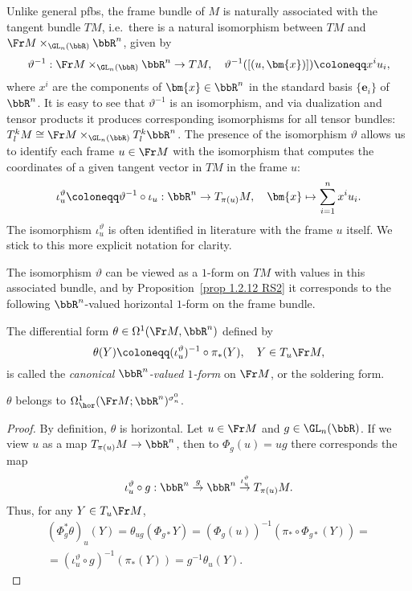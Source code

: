 Unlike general \glspl{pfb}, the frame bundle of $M$ is naturally associated with the tangent bundle $TM$, i.e.\ there is a natural isomorphism between $TM$ and  $\Fr M\times_{\GL_n(\bbR)}\bbR^n$, given by
\[\vartheta^{-1}:\Fr M \times_{\GL_n(\bbR)} \bbR^n\to TM,\quad \vartheta^{-1}([(u,\bm{x})])\coloneqq x^iu_i,\label{eq 2.1.2 RS2}\]
where $x^i$ are the components of $\bm{x}\in\bbR^n$ in the standard basis $\{\bm{e}_i\}$ of $\bbR^n$. It is easy to see that $\vartheta^{-1}$ is an isomorphism, and via dualization and tensor products it produces corresponding isomorphisms for all tensor bundles: $T^k_l M\cong \Fr M\times_{\GL_n(\bbR)}T^k_l\bbR^n$. The presence of the isomorphism $\vartheta$ allows us to identify each frame $u\in \Fr M$ with the isomorphism that computes the coordinates of a given tangent vector in $TM$ in the frame $u$:
\[\iota_u^\vartheta\coloneqq \vartheta^{-1}\circ\iota_u:\bbR^n\to T_{\pi(u)}M,\quad \bm{x}\mapsto \sum_{i=1}^n x^i u_i.\]
The isomorphism $\iota_u^\vartheta$ is often identified in literature with the frame $u$ itself. We stick to this more explicit notation for clarity.

The isomorphism $\vartheta$ can be viewed as a $1$-form on $TM$ with values in this associated bundle, and by Proposition~\ref{prop 1.2.12 RS2} it corresponds to the following $\bbR^n$-valued horizontal $1$-form on the frame bundle.

\begin{defn}
    The differential form $\theta\in\Omega^1(\Fr M,\bbR^n)$ defined by
    \[\theta(Y)\coloneqq (\iota_u^\vartheta)^{-1}\circ\pi_\ast(Y),\quad Y\in T_u\Fr M,\]
    is called the \emph{canonical $\bbR^n$-valued $1$-form} on $\Fr M$, or the soldering form.
\end{defn}


\begin{prop}[{{\cite[Prop.~2.1.4]{RS2}}}]\label{prop 2.1.4 RS2}
    $\theta$ belongs to $\Omega^1_{\hor}(\Fr M; \bbR^n)^{\sigma_n^0}$.
\end{prop}
\begin{proof}
    By definition, $\theta$ is horizontal. Let $u\in\Fr M$ and $g\in \GL_n(\bbR)$. If we view $u$ as a map $T_{\pi(u)}M\to \bbR^n$, then to $\Phi_g(u)=ug$ there corresponds the map
    \[\iota_u^\vartheta\circ g:\bbR^n\overset{g}{\to} \bbR^n\overset{\iota_u^\vartheta}{\to} T_{\pi(u)}M.\] 
    Thus, for any $Y\in T_u \Fr M$,
    \begin{multline}
        (\Phi^\ast_g \theta)_u(Y)=\theta_{ug}(\Phi_{g\ast}Y)=(\Phi_g(u))^{-1}(\pi_\ast\circ \Phi_{g\ast}(Y))=\\
        =(\iota_u^\vartheta\circ g)^{-1}(\pi_\ast (Y))=g^{-1}\theta_u(Y).
    \end{multline}
\end{proof}

